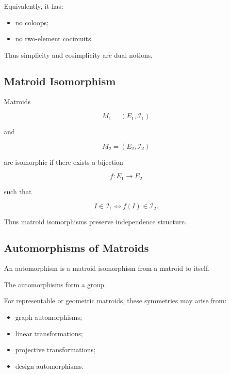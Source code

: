 Equivalently, it has:

\begin{itemize}
    \item no coloops;
    \item no two-element cocircuits.
\end{itemize}

Thus simplicity and cosimplicity are dual notions.

\subsection{Matroid Isomorphism}
\label{subsec:matroid-isomorphism}

Matroids

\[
M_1=(E_1,\mathcal{I}_1)
\]

and

\[
M_2=(E_2,\mathcal{I}_2)
\]

are isomorphic if there exists a bijection

\[
f:E_1\to E_2
\]

such that

\[
\boxed{
I\in\mathcal{I}_1
\iff
f(I)\in\mathcal{I}_2.
}
\]

Thus matroid isomorphisms preserve independence structure.

\subsection{Automorphisms of Matroids}
\label{subsec:matroid-automorphisms}

An automorphism is a matroid isomorphism from a matroid to itself.

The automorphisms form a group.

For representable or geometric matroids, these symmetries may arise
from:

\begin{itemize}
    \item graph automorphisms;
    \item linear transformations;
    \item projective transformations;
    \item design automorphisms.
\end{itemize}

